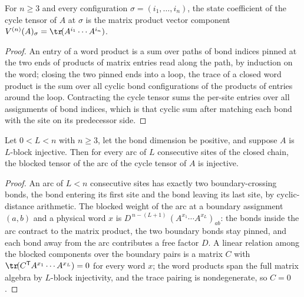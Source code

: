 \begin{lemma}%
    \label{lem:stateCoeff_cycleTensorOfMPS}
    \leanok
    For $n \ge 3$ and every configuration
    $\sigma = (i_1, \ldots, i_n)$, the state coefficient of the cycle
    tensor of $A$ at $\sigma$ is the matrix product vector component
    $V^{(n)}(A)_\sigma = \tr\!(A^{i_1} \cdots A^{i_n})$.
\end{lemma}
\begin{proof}\leanok
    An entry of a word product is a sum over paths of bond indices pinned at
    the two ends of products of matrix entries read along the path, by
    induction on the word; closing the two pinned ends into a loop, the trace
    of a closed word product is the sum over all cyclic bond configurations
    of the products of entries around the loop.  Contracting the cycle tensor
    sums the per-site entries over all assignments of bond indices, which is
    that cyclic sum after matching each bond with the site on its
    predecessor side.
\end{proof}

\begin{lemma}%
    \label{lem:regionBlockedTensorInjective_cycleTensorOfMPS}
    \leanok
    Let $0 < L < n$ with $n \ge 3$, let the bond dimension be positive, and
    suppose $A$ is $L$-block injective.  Then for every arc of $L$
    consecutive sites of the closed chain, the blocked tensor of the arc of
    the cycle tensor of $A$ is injective.
\end{lemma}
\begin{proof}\leanok
    An arc of $L < n$ consecutive sites has exactly two boundary-crossing
    bonds, the bond entering its first site and the bond leaving its last
    site, by cyclic-distance arithmetic.  The blocked weight of the arc at a
    boundary assignment $(a, b)$ and a physical word $x$ is
    $D^{\,n - (L+1)}\,(A^{x_1} \cdots A^{x_L})_{a b}$: the bonds inside
    the arc contract to the matrix product, the two boundary bonds stay
    pinned, and each bond away from the arc contributes a free factor $D$.
    A linear relation among the blocked components over the boundary pairs
    is a matrix $C$ with $\tr\!(C^{\mathsf T} A^{x_1} \cdots A^{x_L}) = 0$
    for every word $x$; the word products span the full matrix algebra by
    $L$-block injectivity, and the trace pairing is nondegenerate, so
    $C = 0$.
\end{proof}

